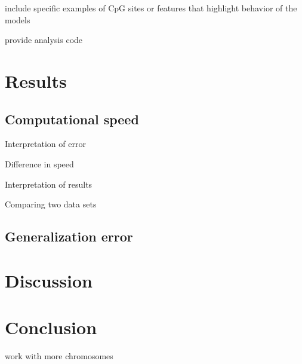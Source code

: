\documentclass{article} %
\begin{document}
include specific examples of CpG sites or features that highlight behavior of the models

provide analysis code

\section{Results}

\subsection{Computational speed}

Interpretation of error

Difference in speed

Interpretation of results

Comparing two data sets

\subsection{Generalization error}



\section{Discussion}



\section{Conclusion}
work with more chromosomes



\end{document}
